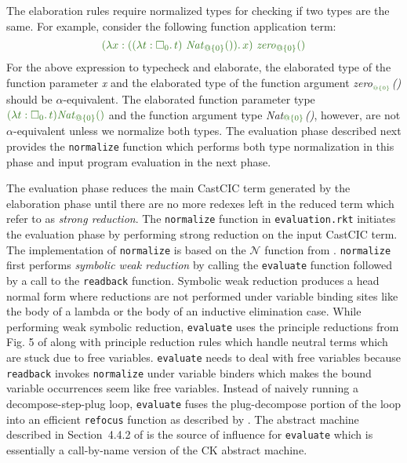 \documentclass{article}
\theoremstyle{definition}
\newcommand{\Gcode}[1]{{\color{OliveGreen}\textit{#1}}}
\newcommand{\Gcmath}[1]{{\color{OliveGreen}#1}}
\newcommand{\Gcsub}[2]{\Gcode{#1}\(\Gcmath{_{#2}}\)}
\begin{document}
The elaboration rules require normalized types for checking if two types are the
same. For example, consider the following function application term:
\[
\Gcmath{(\lambda x : ((\lambda t : \square_0.\, t)\ \text{\Gcode{Nat}}_{@\{0\}}()).\, x)\ \text{\Gcode{zero}}_{@\{0\}}()}
\]
For the above expression to typecheck and elaborate, the elaborated type of the
function parameter \Gcode{x} and the elaborated type of the function argument
\Gcsub{zero}{_{@\{0\}}}\Gcode{()} should be \(\alpha\)-equivalent. The
elaborated function parameter type \(\Gcmath{(\lambda t : \square_0.\, t)
  \text{\Gcode{Nat}}_{@\{0\}}()}\) and the function argument type
\Gcsub{Nat}{@\{0\}}\Gcode{()}, however, are not \(\alpha\)-equivalent unless we
normalize both types. The evaluation phase described next provides the
\texttt{normalize} function which performs both type normalization in this phase
and input program evaluation in the next phase.

The evaluation phase reduces the main CastCIC term generated by the elaboration
phase until there are no more redexes left in the reduced term which
\citet{gregoire_compiled_2002} refer to as \textit{strong reduction}. The
\texttt{normalize} function in \texttt{evaluation.rkt} initiates the evaluation
phase by performing strong reduction on the input CastCIC term. The
implementation of \texttt{normalize} is based on the \(\mathcal{N}\) function
from \citet{gregoire_compiled_2002}. \texttt{normalize} first performs
\textit{symbolic weak reduction} by calling the \texttt{evaluate} function
followed by a call to the \texttt{readback} function. Symbolic weak reduction
produces a head normal form where reductions are not performed under variable
binding sites like the body of a lambda or the body of an inductive elimination
case. While performing weak symbolic reduction, \texttt{evaluate} uses the
principle reductions from Fig. 5 of \citet{lennon-bertrand_gradualizing_2022}
along with principle reduction rules which handle neutral terms which are stuck
due to free variables. \texttt{evaluate} needs to deal with free variables
because \texttt{readback} invokes \texttt{normalize} under variable binders
which makes the bound variable occurrences seem like free variables. Instead of
naively running a decompose-step-plug loop, \texttt{evaluate} fuses the
plug-decompose portion of the loop into an efficient \texttt{refocus} function
as described by \citet{danvy_refocusing_2004}. The abstract machine described in
Section~4.4.2 of \citet{danvy_refocusing_2004} is the source of influence for
\texttt{evaluate} which is essentially a call-by-name version of the CK abstract
machine\cite{felleisen_control_1987}.
\end{document}
